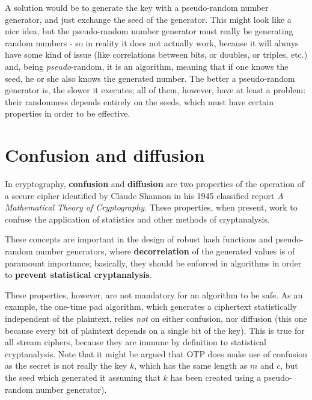A solution would be to generate the key with a pseudo-random number generator, and just
exchange the seed of the generator. This might look like a nice idea, but the pseudo-random number generator must really be generating random numbers - so in reality it does not actually work, because it will always have some kind of issue (like correlations between bits, or doubles, or triples, etc.) and, being \textit{pseudo}-random, it is an algorithm, meaning that if one knows the seed, he or she also knows the generated number. The better a pseudo-random generator is, the slower it executes; all of them, however, have at least a problem: their randomness depends entirely on the seeds, which must have certain properties in order to be effective.


\section{Confusion and diffusion}
In cryptography, \textbf{confusion} and \textbf{diffusion} are two properties of the operation of a secure cipher identified by Claude Shannon in his 1945 classified report \textit{A Mathematical Theory of Cryptography}. These properties, when present, work to confuse the application of statistics and other methods of cryptanalysis.

These concepts are important in the design of robust hash functions and pseudo-random number generators, where \textbf{decorrelation} of the generated values is of paramount importance; basically, they should be enforced in algorithms in order to \textbf{prevent statistical cryptanalysis}.

These properties, however, are not mandatory for an algorithm to be safe. As an example, the one-time pad algorithm, which generates a ciphertext statistically independent of the plaintext, relies \textit{not} on either confusion, nor diffusion (this one because every bit of plaintext depends on a single bit of the key). This is true for all stream ciphers, because they are immune by definition to statistical cryptanalysis. Note that it might be argued that OTP does make use of confusion as the secret is not really the key $k$, which has the same length as $m$ and $c$, but the seed which generated it assuming that $k$ has been created using a pseudo-random number generator).


